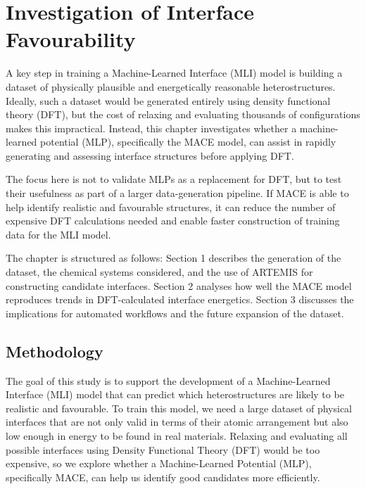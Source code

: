 \chapter{Investigation of Interface Favourability} \label{chapter:computational_investigation}
      
A key step in training a Machine-Learned Interface (MLI) model is building a dataset of physically plausible and energetically reasonable heterostructures. Ideally, such a dataset would be generated entirely using density functional theory (DFT), but the cost of relaxing and evaluating thousands of configurations makes this impractical. Instead, this chapter investigates whether a machine-learned potential (MLP), specifically the MACE model, can assist in rapidly generating and assessing interface structures before applying DFT.      
      
The focus here is not to validate MLPs as a replacement for DFT, but to test their usefulness as part of a larger data-generation pipeline. If MACE is able to help identify realistic and favourable structures, it can reduce the number of expensive DFT calculations needed and enable faster construction of training data for the MLI model.      
      
The chapter is structured as follows: Section 1 describes the generation of the dataset, the chemical systems considered, and the use of ARTEMIS for constructing candidate interfaces. Section 2 analyses how well the MACE model reproduces trends in DFT-calculated interface energetics. Section 3 discusses the implications for automated workflows and the future expansion of the dataset.      
      
\section{Methodology} \label{section:methodology}

The goal of this study is to support the development of a Machine-Learned Interface (MLI) model that can predict which heterostructures are likely to be realistic and favourable. To train this model, we need a large dataset of physical interfaces that are not only valid in terms of their atomic arrangement but also low enough in energy to be found in real materials. Relaxing and evaluating all possible interfaces using Density Functional Theory (DFT) would be too expensive, so we explore whether a Machine-Learned Potential (MLP), specifically MACE, can help us identify good candidates more efficiently.

